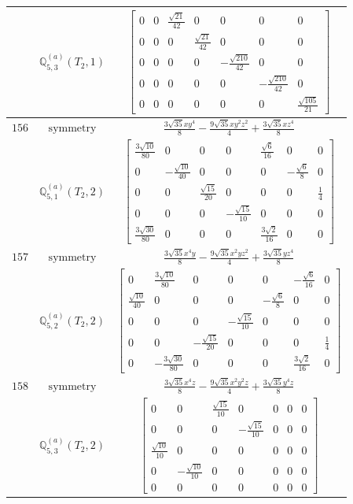\documentclass[fleqn,8pt,landscape]{jsarticle}
\begin{document}
\begin{longtable}{ccc}
$  $ & $ \mathbb{Q}_{5,3}^{(a)}(T_{2},1) $ & $ \begin{bmatrix} 0 & 0 & \frac{\sqrt{21}}{42} & 0 & 0 & 0 & 0 \\ 0 & 0 & 0 & \frac{\sqrt{21}}{42} & 0 & 0 & 0 \\ 0 & 0 & 0 & 0 & - \frac{\sqrt{210}}{42} & 0 & 0 \\ 0 & 0 & 0 & 0 & 0 & - \frac{\sqrt{210}}{42} & 0 \\ 0 & 0 & 0 & 0 & 0 & 0 & \frac{\sqrt{105}}{21} \end{bmatrix} $ \\ \hline
$ 156 $ & $ \text{symmetry} $ & $ \frac{3 \sqrt{35} x y^{4}}{8} - \frac{9 \sqrt{35} x y^{2} z^{2}}{4} + \frac{3 \sqrt{35} x z^{4}}{8} $ \\
$  $ & $ \mathbb{Q}_{5,1}^{(a)}(T_{2},2) $ & $ \begin{bmatrix} \frac{3 \sqrt{10}}{80} & 0 & 0 & 0 & \frac{\sqrt{6}}{16} & 0 & 0 \\ 0 & - \frac{\sqrt{10}}{40} & 0 & 0 & 0 & - \frac{\sqrt{6}}{8} & 0 \\ 0 & 0 & \frac{\sqrt{15}}{20} & 0 & 0 & 0 & \frac{1}{4} \\ 0 & 0 & 0 & - \frac{\sqrt{15}}{10} & 0 & 0 & 0 \\ \frac{3 \sqrt{30}}{80} & 0 & 0 & 0 & \frac{3 \sqrt{2}}{16} & 0 & 0 \end{bmatrix} $ \\ \hline
$ 157 $ & $ \text{symmetry} $ & $ \frac{3 \sqrt{35} x^{4} y}{8} - \frac{9 \sqrt{35} x^{2} y z^{2}}{4} + \frac{3 \sqrt{35} y z^{4}}{8} $ \\
$  $ & $ \mathbb{Q}_{5,2}^{(a)}(T_{2},2) $ & $ \begin{bmatrix} 0 & \frac{3 \sqrt{10}}{80} & 0 & 0 & 0 & - \frac{\sqrt{6}}{16} & 0 \\ \frac{\sqrt{10}}{40} & 0 & 0 & 0 & - \frac{\sqrt{6}}{8} & 0 & 0 \\ 0 & 0 & 0 & - \frac{\sqrt{15}}{10} & 0 & 0 & 0 \\ 0 & 0 & - \frac{\sqrt{15}}{20} & 0 & 0 & 0 & \frac{1}{4} \\ 0 & - \frac{3 \sqrt{30}}{80} & 0 & 0 & 0 & \frac{3 \sqrt{2}}{16} & 0 \end{bmatrix} $ \\ \hline
$ 158 $ & $ \text{symmetry} $ & $ \frac{3 \sqrt{35} x^{4} z}{8} - \frac{9 \sqrt{35} x^{2} y^{2} z}{4} + \frac{3 \sqrt{35} y^{4} z}{8} $ \\
$  $ & $ \mathbb{Q}_{5,3}^{(a)}(T_{2},2) $ & $ \begin{bmatrix} 0 & 0 & \frac{\sqrt{15}}{10} & 0 & 0 & 0 & 0 \\ 0 & 0 & 0 & - \frac{\sqrt{15}}{10} & 0 & 0 & 0 \\ \frac{\sqrt{10}}{10} & 0 & 0 & 0 & 0 & 0 & 0 \\ 0 & - \frac{\sqrt{10}}{10} & 0 & 0 & 0 & 0 & 0 \\ 0 & 0 & 0 & 0 & 0 & 0 & 0 \end{bmatrix} $ \\ \hline

\end{longtable}
\end{document}

